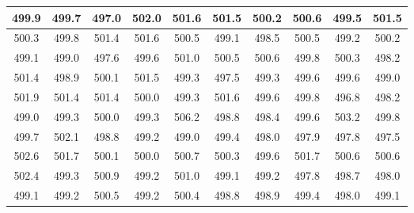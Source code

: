 \documentclass[12pt]{article}
\begin{document}
\begin{table}[]
\begin{tabular}{|c|c|c|c|c|c|c|c|c|c|}
        499.9 & 499.7 & 497.0 & 502.0 & 501.6 & 501.5 & 500.2 & 500.6 & 499.5 & 501.5 \\ \hline
        500.3 & 499.8 & 501.4 & 501.6 & 500.5 & 499.1 & 498.5 & 500.5 & 499.2 & 500.2 \\ \hline
        499.1 & 499.0 & 497.6 & 499.6 & 501.0 & 500.5 & 500.6 & 499.8 & 500.3 & 498.2 \\ \hline
        501.4 & 498.9 & 500.1 & 501.5 & 499.3 & 497.5 & 499.3 & 499.6 & 499.6 & 499.0 \\ \hline
        501.9 & 501.4 & 501.4 & 500.0 & 499.3 & 501.6 & 499.6 & 499.8 & 496.8 & 498.2 \\ \hline
        499.0 & 499.3 & 500.0 & 499.3 & 506.2 & 498.8 & 498.4 & 499.6 & 503.2 & 499.8 \\ \hline
        499.7 & 502.1 & 498.8 & 499.2 & 499.0 & 499.4 & 498.0 & 497.9 & 497.8 & 497.5 \\ \hline
        502.6 & 501.7 & 500.1 & 500.0 & 500.7 & 500.3 & 499.6 & 501.7 & 500.6 & 500.6 \\ \hline
        502.4 & 499.3 & 500.9 & 499.2 & 501.0 & 499.1 & 499.2 & 497.8 & 498.7 & 498.0 \\ \hline
        499.1 & 499.2 & 500.5 & 499.2 & 500.4 & 498.8 & 498.9 & 499.4 & 498.0 & 499.1 \\ \hline
        \end{tabular}
    \end{table}
\end{document}
